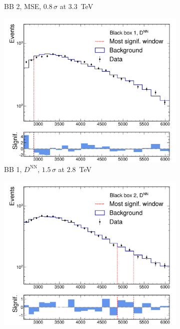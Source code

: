 \documentclass[letterpaper,11pt]{article}
\begin{document}
\begin{figure}[htpb]
\begin{subfigure}[b]{0.45\textwidth}
        \caption*{BB 2, MSE, $0.8\,\sigma$ at $3.3$~TeV}
    \end{subfigure}
    \begin{subfigure}[b]{0.45\textwidth}
        \includegraphics[width=\textwidth]{figures/gae_sparseloss/bb1_EdgeNetSparseLoss_bumphunter.pdf}
        \caption*{BB 1, $D^\mathrm{NN}$, $1.5\,\sigma$ at $2.8$~TeV}
    \end{subfigure}
    \begin{subfigure}[b]{0.45\textwidth}
        \includegraphics[width=\textwidth]{figures/gae_sparseloss/bb2_EdgeNetSparseLoss_bumphunter.pdf}

\end{subfigure}
\end{figure}
\end{document}
